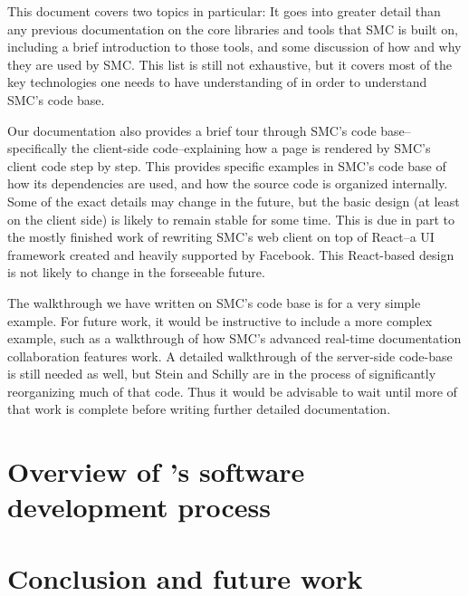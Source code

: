 \documentclass{deliverablereport}
\begin{document}
This document covers two topics in particular: It goes into greater detail than
any previous documentation on the core \JavaScript libraries and tools that SMC
is built on, including a brief introduction to those tools, and some discussion
of how and why they are used by SMC.  This list is still not exhaustive, but it
covers most of the key technologies one needs to have understanding of in order
to understand SMC's code base.

Our documentation also provides a brief tour through SMC's code base--
specifically the client-side code--explaining how a page is rendered by SMC's
client code step by step.  This provides specific examples in SMC's code base
of how its dependencies are used, and how the source code is organized
internally.  Some of the exact details may change in the future, but the basic
design (at least on the client side) is likely to remain stable for some time.
This is due in part to the mostly finished work of rewriting SMC's web client
on top of React--a \JavaScript UI framework created and heavily supported by
Facebook.  This React-based design is not likely to change in the forseeable
future.

The walkthrough we have written on SMC's code base is for a very simple
example.  For future work, it would be instructive to include a more complex
example, such as a walkthrough of how SMC's advanced real-time documentation
collaboration features work.  A detailed walkthrough of the server-side
code-base is still needed as well, but Stein and Schilly are in the process of
significantly reorganizing much of that code. Thus it would be advisable to
wait until more of that work is complete before writing further detailed
documentation.


\section{Overview of \SMC's software development process}

\section{Conclusion and future work}


\printbibliography
\end{document}
